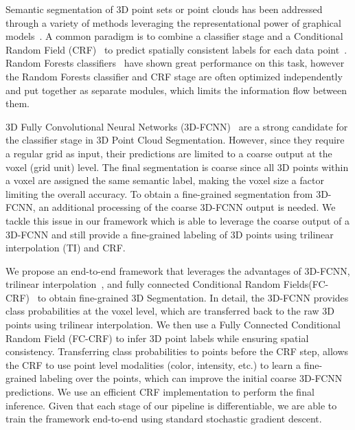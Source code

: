 \documentclass[10pt,twocolumn,letterpaper]{article}
\newcommand{\fccrf}[0]{CRF\xspace}
\newcommand{\threedfcnn}[0]{3D-FCNN\xspace}
\begin{document}
Semantic segmentation of 3D point sets or point clouds has been addressed through a variety of methods leveraging the representational power of graphical models~\cite{Koppula2011, Lu2012,Anand2013,munoz-eccv-12,hu-icra-13, Kim2013}. A common paradigm is to combine a classifier stage and a Conditional Random Field (CRF)~\cite{Lafferty2001CRF} to predict spatially consistent labels for each data point~\cite{Wolf2015,Wolf2016, Martinovic2015,conf/itsc/WangLA15,Wolf2016}. Random Forests classifiers~\cite{Breiman2001,Criminisi2013} have shown great performance on this task, however the Random Forests classifier and CRF stage are often optimized independently and put together as separate modules, which limits the information flow between them.

3D Fully Convolutional Neural Networks (\threedfcnn)~\cite{fcnn} are a strong candidate for the classifier stage in 3D Point Cloud Segmentation. However, since they require a regular grid as input, their predictions are limited to a coarse output at the voxel (grid unit) level. The final segmentation is coarse since all 3D points within a voxel are assigned the same semantic label, making the voxel size a factor limiting the overall accuracy. To obtain a fine-grained segmentation from \threedfcnn, an additional processing of the coarse \threedfcnn output is needed. We tackle this issue in our framework which is able to leverage the coarse output of a \threedfcnn and still provide a fine-grained labeling of 3D points using trilinear interpolation (TI) and CRF.

We propose an end-to-end framework that leverages the advantages of \threedfcnn, trilinear interpolation~\cite{http://bigwww.epfl.ch/publications/meijering0201.html}, and fully connected Conditional Random Fields(FC-CRF)~\cite{Lafferty2001CRF,denseCRF} to obtain fine-grained 3D Segmentation. In detail, the \threedfcnn provides class probabilities at the voxel level, which are transferred back to the raw 3D points using trilinear interpolation. We then use a Fully Connected Conditional Random Field (FC-CRF) to infer 3D point labels while ensuring spatial consistency. Transferring class probabilities to points before the \fccrf step, allows the \fccrf to use point level modalities (color, intensity, etc.) to learn a fine-grained labeling over the points, which can improve the initial coarse \threedfcnn predictions.
We use an efficient \fccrf implementation to perform the final inference. Given that each stage of our pipeline is differentiable, we are able to train the framework end-to-end using standard stochastic gradient descent.
\end{document}

